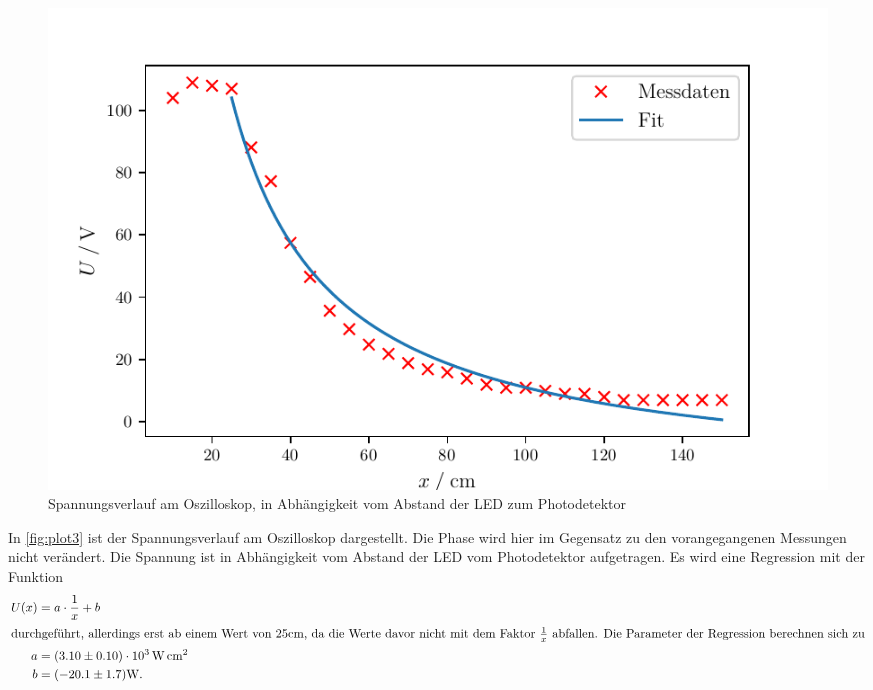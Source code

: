 \begin{figure}
  \centering
  \includegraphics{build/plot3.pdf}
  \caption{Spannungsverlauf am Oszilloskop, in Abhängigkeit vom Abstand der LED zum Photodetektor}
  \label{fig:plot3}
\end{figure}
In \autoref{fig:plot3} ist der Spannungsverlauf am Oszilloskop dargestellt. Die Phase wird hier im Gegensatz zu den vorangegangenen Messungen nicht verändert.
Die Spannung ist in Abhängigkeit vom Abstand der LED vom Photodetektor aufgetragen.
Es wird eine Regression mit der Funktion
\begin{align*}
U(x)&=a \cdot \frac{1}{x} +b\\
\intertext{durchgeführt, allerdings erst ab einem Wert von 25cm, da die Werte davor nicht mit dem Faktor $\frac{1}{x}$ abfallen. Die Parameter der Regression
berechnen sich zu}
a&= (3.10 \pm 0.10) \cdot 10^3 \, \si{\watt\centi\meter\squared}\\
b&= (-20.1 \pm 1.7) \si{\watt}.
\end{align*}

